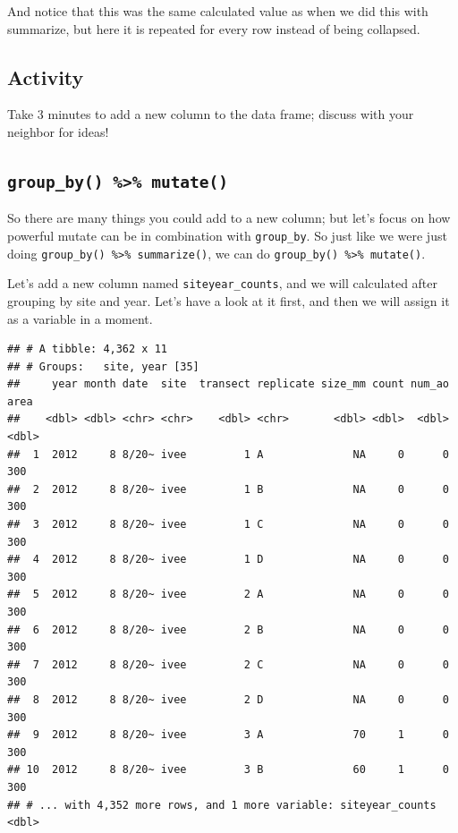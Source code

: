 \documentclass[]{book}
\newenvironment{Shaded}{\begin{snugshade}}{\end{snugshade}}
\newcommand{\DataTypeTok}[1]{\textcolor[rgb]{0.13,0.29,0.53}{#1}}
\newcommand{\KeywordTok}[1]{\textcolor[rgb]{0.13,0.29,0.53}{\textbf{#1}}}
\newcommand{\NormalTok}[1]{#1}
\newcommand{\OperatorTok}[1]{\textcolor[rgb]{0.81,0.36,0.00}{\textbf{#1}}}
\newcommand{\StringTok}[1]{\textcolor[rgb]{0.31,0.60,0.02}{#1}}
\begin{document}
And notice that this was the same calculated value as when we did this with summarize, but here it is repeated for every row instead of being collapsed.

\hypertarget{activity-6}{%
\subsection{Activity}\label{activity-6}}

Take 3 minutes to add a new column to the data frame; discuss with your neighbor for ideas!

\hypertarget{group_by-mutate}{%
\subsection{\texorpdfstring{\texttt{group\_by()\ \%\textgreater{}\%\ mutate()}}{group\_by() \%\textgreater{}\% mutate()}}\label{group_by-mutate}}

So there are many things you could add to a new column; but let's focus on how powerful mutate can be in combination with \texttt{group\_by}. So just like we were just doing \texttt{group\_by()\ \%\textgreater{}\%\ summarize()}, we can do \texttt{group\_by()\ \%\textgreater{}\%\ mutate()}.

Let's add a new column named \texttt{siteyear\_counts}, and we will calculated after grouping by site and year. Let's have a look at it first, and then we will assign it as a variable in a moment.

\begin{Shaded}
\end{Shaded}

\begin{verbatim}
## # A tibble: 4,362 x 11
## # Groups:   site, year [35]
##     year month date  site  transect replicate size_mm count num_ao  area
##    <dbl> <dbl> <chr> <chr>    <dbl> <chr>       <dbl> <dbl>  <dbl> <dbl>
##  1  2012     8 8/20~ ivee         1 A              NA     0      0   300
##  2  2012     8 8/20~ ivee         1 B              NA     0      0   300
##  3  2012     8 8/20~ ivee         1 C              NA     0      0   300
##  4  2012     8 8/20~ ivee         1 D              NA     0      0   300
##  5  2012     8 8/20~ ivee         2 A              NA     0      0   300
##  6  2012     8 8/20~ ivee         2 B              NA     0      0   300
##  7  2012     8 8/20~ ivee         2 C              NA     0      0   300
##  8  2012     8 8/20~ ivee         2 D              NA     0      0   300
##  9  2012     8 8/20~ ivee         3 A              70     1      0   300
## 10  2012     8 8/20~ ivee         3 B              60     1      0   300
## # ... with 4,352 more rows, and 1 more variable: siteyear_counts <dbl>
\end{verbatim}
\end{document}
